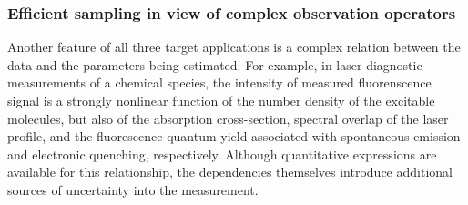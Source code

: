 \documentclass[11pt]{article}
\newcommand{\MarginPar}[1]{\marginpar{%
\vskip-\baselineskip %
\raggedright\tiny\sffamily
\hrule\smallskip{\color{red}#1}\par\smallskip\hrule}}
\begin{document}
\subsubsection*{Efficient sampling in view of complex observation operators}

Another feature of all three target applications is a complex relation between the data and the parameters being estimated.
For example, in laser diagnostic measurements of a chemical species,
the intensity of measured fluorenscence signal is a strongly nonlinear function of the number density of
the excitable molecules, but also of the absorption cross-section, spectral overlap of the laser profile, 
and the fluorescence quantum yield associated with spontaneous emission and electronic quenching, respectively.
Although quantitative expressions are available for this relationship, the dependencies themselves 
introduce additional sources of uncertainty into the measurement.
\MarginPar{MSD: Shortened}
\end{document}
